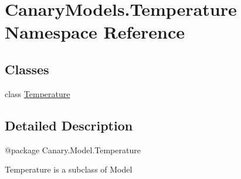 \hypertarget{namespace_canary_models_1_1_temperature}{\section{Canary\-Models.\-Temperature Namespace Reference}
\label{namespace_canary_models_1_1_temperature}
}
\subsection*{Classes}
\begin{DoxyCompactItemize}
\item 
class \hyperlink{class_canary_models_1_1_temperature_1_1_temperature}{Temperature}
\end{DoxyCompactItemize}


\subsection{Detailed Description}
\begin{DoxyVerb}@package Canary.Model.Temperature

Temperature is a subclass of Model
\end{DoxyVerb}
 
